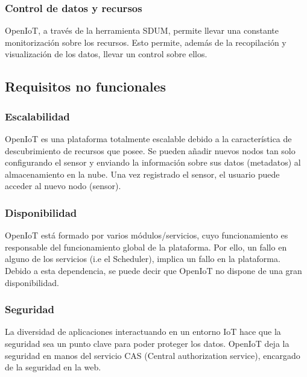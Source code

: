 \documentclass[12pt, twoside]{book}
\begin{document}
\subsubsection*{Control de datos y recursos}
OpenIoT, a través de la herramienta SDUM, permite llevar una constante monitorización sobre los recursos. Esto permite, además de la recopilación y visualización de los datos, llevar un control sobre ellos.


\subsection{Requisitos no funcionales}

\subsubsection*{Escalabilidad}
OpenIoT es una plataforma totalmente escalable debido a la característica de descubrimiento de recursos que posee. Se pueden añadir nuevos nodos tan solo configurando el sensor y enviando la información sobre sus datos (metadatos) al almacenamiento en la nube. Una vez registrado el sensor, el usuario puede acceder al nuevo nodo (sensor).
\subsubsection*{Disponibilidad}
OpenIoT está formado por varios módulos/servicios, cuyo funcionamiento es responsable del funcionamiento global de la plataforma. Por ello, un fallo en alguno de los servicios (i.e el Scheduler), implica un fallo en la plataforma. 
Debido a esta dependencia, se puede decir que OpenIoT no dispone de una gran disponibilidad.
\subsubsection*{Seguridad}
La diversidad de aplicaciones interactuando en un entorno IoT hace que la seguridad sea un punto clave para poder proteger los datos. OpenIoT deja la seguridad en manos del servicio CAS (Central authorization service), encargado de la seguridad en la web.\\
\end{document}

